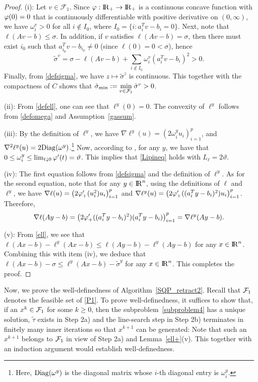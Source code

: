 \documentclass[10pt]{article}
\numberwithin{equation}{section}
\def\R{{\rm I\!R}}
\def\Diag{{\rm Diag}}
\def\sigmamin{{\rm\tilde{\sigma}_{min}}}
\begin{document}
\begin{proof}
(i): Let $v \in \mathcal{F}_1$. Since ${\color{black} \varphi}:\R_+\to \R_+$ is a continuous concave function with ${\color{black} \varphi}(0) = 0$ that is continuously differentiable with positive derivative on $(0, \infty)$, we have $\omega_i^v > 0$ for all $i \notin I_0$, where $I_0=\{i: a_i^Tv-b_i=0\}$. Next, note that $\ell(Av - b) \leq \sigma$. In addition, if $v$ satisfies $\ell(Av - b) = \sigma$, then there must exist $i_0$ such that $a_{i_0}^Tv - b_{i_0} \not= 0$ (since $\ell(0) = 0 < \sigma$), hence
\[
\tilde{\sigma}^v = \sigma - \ell(Av - b) + \sum_{ i \notin I_{0}} \omega_i^v(a_i^Tv - b_i)^2 > 0.
 \]
Finally, from \eqref{defsigma}, we have $z\mapsto \tilde{\sigma}^z$ is continuous. This together with the compactness of $C$ shows that $\sigmamin:= \min\limits_{v\in \mathcal{F}_1}\tilde{\sigma}^v > 0$.

(ii): From \eqref{defell}, one can see that $\ell^y(0) = 0$. The convexity of $\ell^y$ follows from \eqref{defomega} and Assumption~\ref{gassum}.

(iii): By the definition of $\ell^y$, we have $\nabla \ell^y (u) = (2\omega_i^yu_i)_{i=1}^p$, and $\nabla^2\ell^y (u) = 2\Diag(\omega^y)$.\footnote{Here, $\Diag(\omega^y)$ is the diagonal matrix whose $i$-th diagonal entry is $\omega^y_i$.} Now, according to \cite[Lemma~2.2]{YuPo19}, for any $y$, we have that $0\le\omega_i^y\leq \lim_{t\downarrow 0}{\color{black} \varphi}'(t)=\vartheta$. This implies that \eqref{Lipineq} holds with $L_{\ell} = 2\vartheta$.

(iv): The first equation follows from \eqref{defsigma} and the definition of $\ell^y$. As for the second equation, note that for any $y\in\R^n$, using the definitions of $\ell$ and $\ell^y$, we have $\nabla\ell(u) = \left(2{\color{black} \varphi}_+'(u_i^2)u_i\right)_{i=1}^p$ and $\nabla\ell^y(u) = \left(2{\color{black} \varphi}_+'((a_i^Ty - b_i)^2)u_i\right)_{i=1}^p$. Therefore,
\[
 \nabla\ell(Ay - b) = \left(2{\color{black} \varphi}_+'((a_i^Ty - b_i)^2)(a_i^Ty - b_i)\right)_{i=1}^p = \nabla\ell^y(Ay - b).
\]

(v): From \eqref{ell}, we see that $\ell(Ax - b) - \ell^y(Ax - b) \leq \ell(Ay - b) - \ell^y(Ay - b)$ for any $x\in \R^n$. Combining this with item (iv), we deduce that $\ell(Ax - b) - \sigma \leq \ell^y(Ax - b) - \tilde{\sigma}^y$ for any $x\in \R^n$. This completes the proof.
\end{proof}

Now, we prove the well-definedness of Algorithm~\ref{SQP_retract2}. Recall that ${\cal F}_1$ denotes the feasible set of \eqref{P1}. To prove well-definedness, it suffices to show that, if an $x^k\in {\cal F}_1$  for some $k\ge 0$, then the subproblem~\eqref{subproblem4} has a unique solution, $\widetilde\tau$ exists in Step 2a) and the line-search step in Step 2b) terminates in finitely many inner iterations so that $x^{k+1}$ can be generated: Note that such an $x^{k+1}$ belongs to ${\cal F}_1$ in view of Step 2a) and Lemma~\ref{ell+}(v). This together with an induction argument would establish well-definedness.
\end{document}
